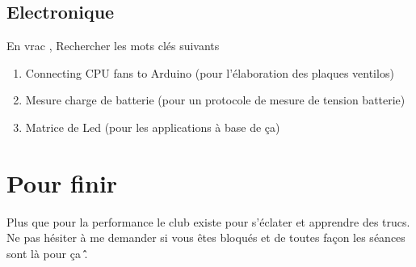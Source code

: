 \documentclass[fleqn,10pt]{SelfArx} %
\begin{document}
\subsection{Electronique}
En vrac , Rechercher les mots clés suivants

\begin{enumerate}[noitemsep] %
	\item Connecting CPU fans to Arduino (pour l'élaboration des plaques ventilos)
	\item Mesure charge de batterie (pour un protocole de mesure de tension batterie)
	\item Matrice de Led (pour les applications à base de ça)
\end{enumerate}


\section*{Pour finir} %


Plus que pour la performance le club existe pour s'éclater et apprendre des trucs. Ne pas hésiter à me demander si vous êtes bloqués et de toutes façon les séances sont là pour ça \^\^.


\end{document}
